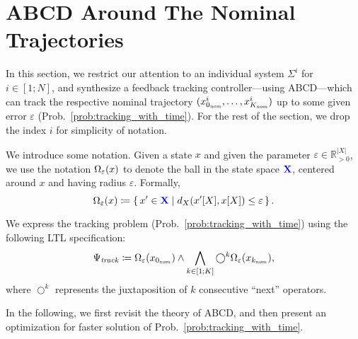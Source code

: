 \section{ABCD Around The Nominal Trajectories}\label{sec:tracking}

In this section, we restrict our attention to an individual system $\Sigma^i$ for $i\in [1;N]$, and synthesize a feedback tracking controller---using ABCD---which can track the respective nominal trajectory $(x_{0_{\mathit{nom}}}^i,\ldots,x_{K_{\mathit{nom}}}^i)$ up to some given error $\varepsilon$ (Prob.~\ref{prob:tracking_with_time}).
For the rest of the section, we drop the index $i$ for simplicity of notation.

We introduce some notation.
Given a state $x$ and given the parameter $\varepsilon\in \mathbb{R}_{>0}^{|X|}$, we use the notation $\Omega_\varepsilon( x)$ to denote the ball in the state space ${\color{blue} \mathbf{X}}$, centered around $x$ and having radius $\varepsilon$.
Formally, \[\Omega_\varepsilon(x)\coloneqq \set{x'
	\in {\color{blue} \mathbf{X}} \mid  d_X(x'[X],x[X])\leq \varepsilon }.\] 

We express the tracking problem (Prob.~\ref{prob:tracking_with_time}) using the following LTL specification:
\begin{align}
	\Psi_{\mathit{track}}\coloneqq \Omega_\varepsilon(x_{0_{\mathit{nom}}}) \wedge \bigwedge_{k\in [1;K]} \bigcirc^k \Omega_\varepsilon(x_{k_{\mathit{nom}}}),
\end{align}
where $\bigcirc^k$ represents the juxtaposition of $k$ consecutive ``next'' operators.

In the following, we first revisit the theory of ABCD, and then present an optimization for faster solution of Prob.~\ref{prob:tracking_with_time}.
 
 \begin{comment}
The specification $\Psi_\track$ in general requires controller with memory, as we show in the following example.

\begin{example}
	Consider the one-dimensional control system $(\mathbb{R},\set{0,+1}, \emptyset, f)$ with the following dynamics:
	\begin{align*}
		\dot{\xi} = f(\xi,u) = u.
	\end{align*}
	Let the sampling time be $1$, the nominal trajectory be $(0,1,0,-1)$, and 
\end{example}
\end{comment}

